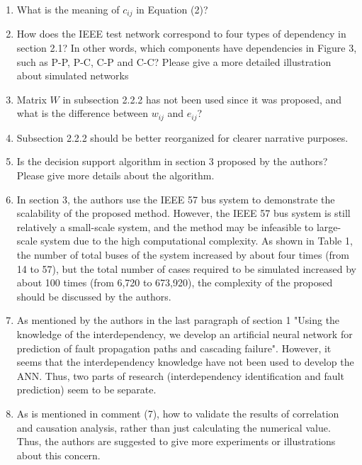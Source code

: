 \documentclass{article}
\begin{document}
\begin{enumerate}
  \item What is the meaning of $c_{ij}$ in Equation (2)?
  \item How does the IEEE test network correspond to four types of dependency in section 2.1? In other words, which components have dependencies in Figure 3, such as P-P, P-C, C-P and C-C? Please give a more detailed illustration about simulated networks
  \item Matrix $W$ in subsection 2.2.2 has not been used since it was proposed, and what is the difference between $w_{ij}$ and $e_{ij}$?
  \item Subsection 2.2.2 should be better reorganized for clearer narrative purposes.
  \item Is the decision support algorithm in section 3 proposed by the authors? Please give more details about the algorithm.
  \item In section 3, the authors use the IEEE 57 bus system to demonstrate the scalability of the proposed method. However, the IEEE 57 bus system is still relatively a small-scale system, and the method may be infeasible to large-scale system due to the high computational complexity. As shown in Table 1, the number of total buses of the system increased by about four times (from 14 to 57), but the total number of cases required to be simulated increased by about 100 times (from 6,720 to 673,920), the complexity of the proposed should be discussed by the authors.
  \item As mentioned by the authors in the last paragraph of section 1 "Using the knowledge of the interdependency, we develop an artificial neural network for prediction of fault propagation paths and cascading failure". However, it seems that the interdependency knowledge have not been used to develop the ANN. Thus, two parts of research (interdependency identification and fault prediction) seem to be separate.
  \item As is mentioned in comment (7), how to validate the results of correlation and causation analysis, rather than just calculating the numerical value. Thus, the authors are suggested to give more experiments or illustrations about this concern.
\end{enumerate}
\end{document}
